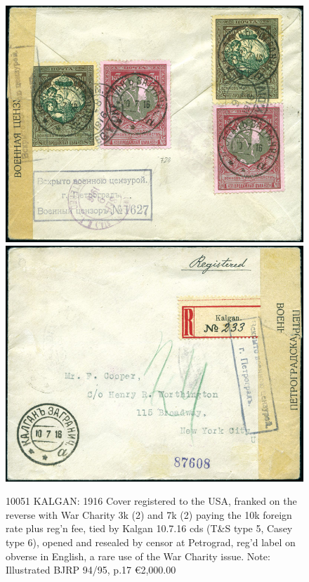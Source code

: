 \begin{figure}[htbp]
\centering
\includegraphics[width=.95\textwidth]{../russian-post-offices-in-china/10051.jpg}
\includegraphics[width=.95\textwidth]{../russian-post-offices-in-china/10051-1.jpg}
\caption{
10051 KALGAN: 1916 Cover registered to the USA, franked on the reverse with 
War Charity 3k (2) and 7k (2) paying the 10k foreign rate plus reg'n fee, 
tied by Kalgan 10.7.16 cds (T\&S type 5, Casey type 6), opened and resealed 
by censor at Petrograd, reg'd label on obverse in English, a rare use of 
the War Charity issue.
Note: Illustrated BJRP 94/95, p.17
\euro 2,000.00 
}  
\end{figure} 




















                                                